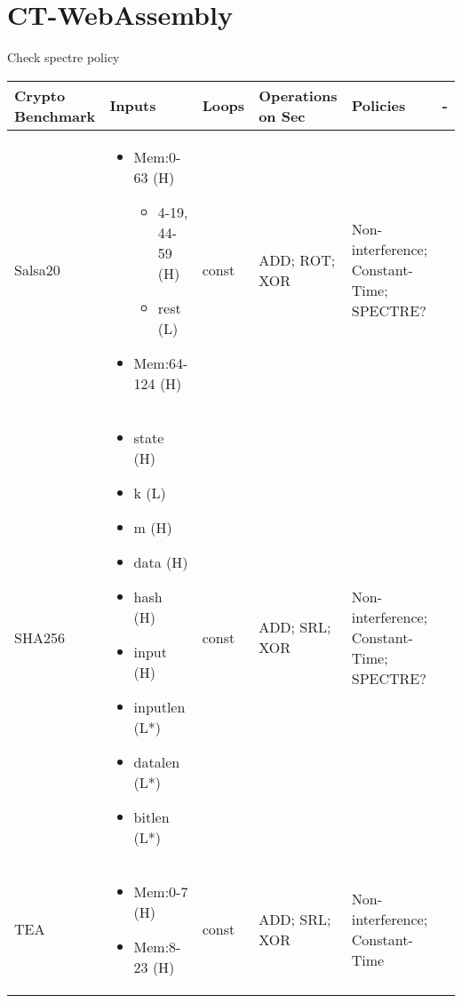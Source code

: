 \documentclass[12pt]{article} %
\begin{document}
\section{CT-WebAssembly}
Check spectre policy
{\footnotesize
\begin{longtable}{|M{0.12\textwidth}|M{0.20\textwidth}M{0.12\textwidth}M{0.12\textwidth}M{0.20\textwidth}M{0.06\textwidth}|}
  \hline
  Crypto Benchmark & Inputs& Loops & Operations on Sec&Policies & - \\
  \hline
  Salsa20 &
      \begin{itemize}
      \item Mem:0-63 (H)
        \begin{itemize}
        \item 4-19, 44-59 (H)
        \item rest (L)
        \end{itemize}
      \item Mem:64-124 (H)
      \end{itemize} & const& ADD; ROT; XOR & Non-interference; Constant-Time; SPECTRE? &\\\hline
  SHA256 &
      \begin{itemize}
      \item state (H)
      \item k (L)
      \item m (H)
      \item data (H)
      \item hash (H)
      \item input (H)
      \item inputlen (L*)
      \item datalen (L*)
      \item bitlen (L*)
      \end{itemize} & const& ADD; SRL; XOR & Non-interference; Constant-Time; SPECTRE? &\\\hline
  TEA &
      \begin{itemize}
      \item Mem:0-7 (H)
      \item Mem:8-23 (H)
      \end{itemize} & const& ADD; SRL; XOR & Non-interference; Constant-Time &\\\hline
      \hline
\end{longtable}
}
\end{document}

